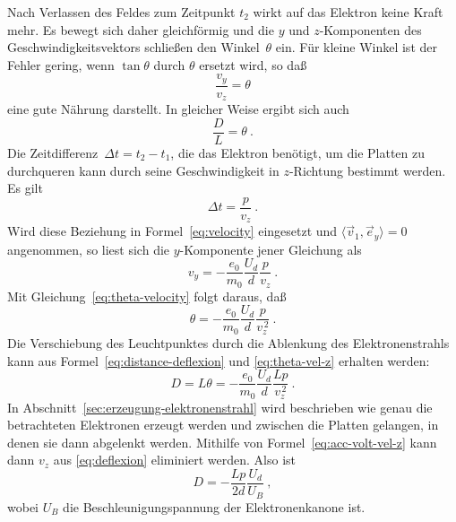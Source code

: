 Nach Verlassen des Feldes zum Zeitpunkt $t_2$ wirkt auf das Elektron
keine Kraft mehr. Es bewegt sich daher gleichförmig und die $y$ und
$z$-Komponenten des Geschwindigkeitsvektors schließen den
Winkel~$\theta$ ein. Für kleine Winkel ist der Fehler gering, wenn
$\tan\theta$ durch $\theta$ ersetzt wird, so daß
%
\begin{equation}
  \label{eq:theta-velocity}
  \frac{v_y}{v_z} = \theta
\end{equation}
%
eine gute Nährung darstellt. In gleicher Weise ergibt sich  auch
%
\begin{equation}
  \label{eq:distance-deflexion}
  \frac{D}{L} = \theta \:.
\end{equation}
%
Die Zeitdifferenz~$\Delta t = t_2-t_1$, die das Elektron benötigt, um
die Platten zu durchqueren kann durch seine Geschwindigkeit in
$z$-Richtung bestimmt werden. Es gilt
%
\begin{equation}
  \Delta t = \frac{p}{v_z} \:.
\end{equation}
%
Wird diese Beziehung in Formel~\eqref{eq:velocity} eingesetzt und
$\langle\vec{v}_1,\vec{e}_y\rangle = 0$ angenommen, so
liest sich die $y$-Komponente jener Gleichung als
%
\begin{equation}
  \label{eq:vel-y-vel-z}
  v_y = - \frac{e_0}{m_0}\frac{U_d}{d} \frac{p}{v_z} \:.
\end{equation}
%
Mit Gleichung~\eqref{eq:theta-velocity} folgt daraus, daß
%
\begin{equation}
  \label{eq:theta-vel-z}
  \theta = - \frac{e_0}{m_0}\frac{U_d}{d} \frac{p}{v_z^{\,2}} \:.
\end{equation}
%
Die Verschiebung des Leuchtpunktes durch die Ablenkung des
Elektronenstrahls kann aus Formel~\eqref{eq:distance-deflexion} und
\eqref{eq:theta-vel-z} erhalten werden:
%
\begin{equation}
  \label{eq:deflexion}
  D = L\theta = - \frac{e_0}{m_0}\frac{U_d}{d} \frac{Lp}{v_z^{\,2}} \:.
\end{equation}
%
In Abschnitt~\vref{sec:erzeugung-elektronenstrahl} wird beschrieben wie
genau die betrachteten Elektronen erzeugt werden und zwischen die
Platten gelangen, in denen sie dann abgelenkt werden. Mithilfe von
Formel~\eqref{eq:acc-volt-vel-z} kann dann $v_z$ aus
\eqref{eq:deflexion} eliminiert werden. Also ist
%
\begin{equation}
  D = - \frac{Lp}{2d} \frac{U_d}{U_B} \:,
\end{equation}
%
wobei $U_B$ die Beschleunigungspannung der Elektronenkanone ist.

